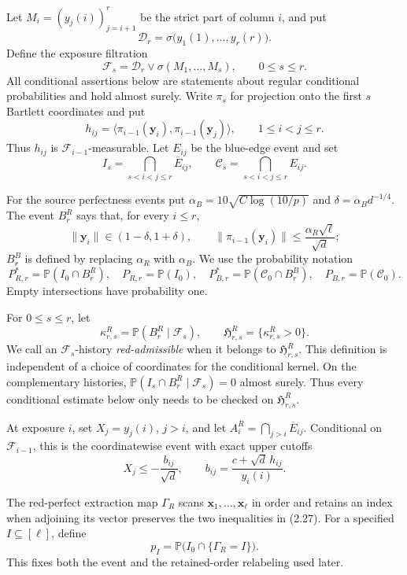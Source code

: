 Let \(M_i=(y_j(i))_{j=i+1}^r\) be the strict part of column \(i\), and put
\[
 \mathcal D_r=\sigma\bigl(y_1(1),\ldots,y_r(r)\bigr).
\]
Define the exposure filtration
\[
 \mathcal F_s=\mathcal D_r\vee\sigma(M_1,\ldots,M_s),
 \qquad 0\le s\le r.
\tag{2.24}
\]
All conditional assertions below are statements about regular conditional
probabilities and hold almost surely.  Write \(\pi_s\) for projection onto
the first \(s\) Bartlett coordinates and put
\[
 h_{ij}=\langle\pi_{i-1}(\boldsymbol y_i),
                   \pi_{i-1}(\boldsymbol y_j)\rangle,
 \qquad 1\le i<j\le r.
\tag{2.25}
\]
Thus \(h_{ij}\) is \(\mathcal F_{i-1}\)-measurable.  Let \(E_{ij}\) be the
blue-edge event and set
\[
 I_s=\bigcap_{s<i<j\le r}\overline E_{ij},\qquad
 \mathcal C_s=\bigcap_{s<i<j\le r}E_{ij}.
\tag{2.26}
\]

For the source perfectness events put
\(\alpha_B=10\sqrt{C\log(10/p)}\) and
\(\delta=\alpha_Bd^{-1/4}\).  The event \(B^R_r\) says that, for every
\(i\le r\),
\[
 \|\boldsymbol y_i\|\in(1-\delta,1+\delta),\qquad
 \|\pi_{i-1}(\boldsymbol y_i)\|
 \le \frac{\alpha_R\sqrt\ell}{\sqrt d};
\tag{2.27}
\]
\(B^B_r\) is defined by replacing \(\alpha_R\) with \(\alpha_B\).  We use
the probability notation
\[
 P^*_{R,r}=\mathbb P(I_0\cap B^R_r),\quad
 P_{R,r}=\mathbb P(I_0),\quad
 P^*_{B,r}=\mathbb P(\mathcal C_0\cap B^B_r),\quad
 P_{B,r}=\mathbb P(\mathcal C_0).
\tag{2.28}
\]
Empty intersections have probability one.

For \(0\le s\le r\), let
\[
 \kappa^R_{r,s}=\mathbb P(B^R_r\mid\mathcal F_s),\qquad
 \mathfrak H^R_{r,s}=\{\kappa^R_{r,s}>0\}.
\tag{2.29}
\]
We call an \(\mathcal F_s\)-history \emph{red-admissible} when it belongs to
\(\mathfrak H^R_{r,s}\).  This definition is independent of a choice of
coordinates for the conditional kernel.  On the complementary histories,
\(\mathbb P(I_s\cap B^R_r\mid\mathcal F_s)=0\) almost surely.  Thus every
conditional estimate below only needs to be checked on
\(\mathfrak H^R_{r,s}\).

At exposure \(i\), set \(X_j=y_j(i)\), \(j>i\), and let
\(A_i^R=\bigcap_{j>i}\overline E_{ij}\).  Conditional on
\(\mathcal F_{i-1}\), this is the coordinatewise event with exact upper
cutoffs
\[
 X_j\le-\frac{b_{ij}}{\sqrt d},\qquad
 b_{ij}=\frac{c+\sqrt d\,h_{ij}}{y_i(i)}.
\tag{2.30}
\]

The red-perfect extraction map \(\Gamma_R\) scans
\(\boldsymbol x_1,\ldots,\boldsymbol x_\ell\) in order and retains an index
when adjoining its vector preserves the two inequalities in (2.27).  For a
specified \(I\subseteq[\ell]\), define
\[
 p_I=\mathbb P\bigl(I_0\cap\{\Gamma_R=I\}\bigr).
\tag{2.31}
\]
This fixes both the event and the retained-order relabeling used later.

